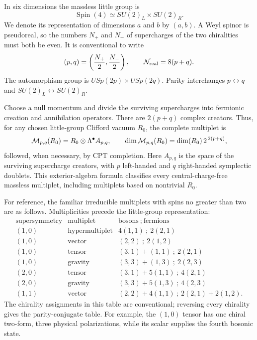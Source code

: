 \ExerciseEditorialNote

\begin{enumerate}
  In six dimensions the massless little group is
  \[
    \operatorname{Spin}(4)\simeq SU(2)_L\times SU(2)_R .
  \]
  We denote its representation of dimensions \(a\) and \(b\) by
  \((a,b)\).  A Weyl spinor is pseudoreal, so the numbers \(N_+\) and
  \(N_-\) of supercharges of the two chiralities must both be even.  It
  is conventional to write
  \[
    (p,q)=\left(\frac{N_+}{2},\frac{N_-}{2}\right),\qquad
    {\cal N}_{\rm real}=8(p+q).
  \]
  The automorphism group is
  \(USp(2p)\times USp(2q)\).  Parity interchanges \(p\leftrightarrow q\)
  and \(SU(2)_L\leftrightarrow SU(2)_R\).

  Choose a null momentum and divide the surviving supercharges into
  fermionic creation and annihilation operators.  There are
  \(2(p+q)\) complex creators.  Thus, for any chosen little-group
  Clifford vacuum \(R_0\), the complete multiplet is
  \[
    {\cal M}_{p,q}(R_0)
      =R_0\mathbin{\otimes}\Lambda^\bullet A_{p,q},
      \qquad
      \dim{\cal M}_{p,q}(R_0)
      =\dim(R_0)\,2^{\,2(p+q)} ,
  \]
  followed, when necessary, by CPT completion.  Here \(A_{p,q}\) is
  the space of the surviving supercharge creators, with \(p\)
  left-handed and \(q\) right-handed symplectic doublets.  This
  exterior-algebra formula classifies every central-charge-free
  massless multiplet, including multiplets based on nontrivial
  \(R_0\).

  For reference, the familiar irreducible multiplets with spins no
  greater than two are as follows.  Multiplicities precede the
  little-group representation:
  \[
  \begin{array}{c|l|l}
    \text{supersymmetry}&\text{multiplet}&
       \text{bosons}\ ;\ \text{fermions}\\ \hline
    (1,0)&\text{hypermultiplet}&
      4(1,1)\ ;\ 2(2,1)\\
    (1,0)&\text{vector}&
      (2,2)\ ;\ 2(1,2)\\
    (1,0)&\text{tensor}&
      (3,1)+(1,1)\ ;\ 2(2,1)\\
    (1,0)&\text{gravity}&
      (3,3)+(1,3)\ ;\ 2(2,3)\\[2pt]
    (2,0)&\text{tensor}&
      (3,1)+5(1,1)\ ;\ 4(2,1)\\
    (2,0)&\text{gravity}&
      (3,3)+5(1,3)\ ;\ 4(2,3)\\[2pt]
    (1,1)&\text{vector}&
      (2,2)+4(1,1)\ ;\ 2(2,1)+2(1,2).
  \end{array}
  \]
  The chirality assignments in this table are conventional; reversing
  every chirality gives the parity-conjugate table.  For example, the
  \((1,0)\) tensor has one chiral two-form, three physical
  polarizations, while its scalar supplies the fourth bosonic state.


\end{enumerate}
